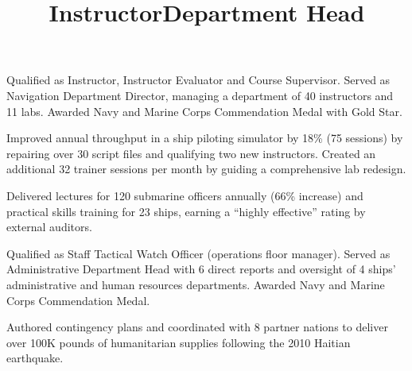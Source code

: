 \documentclass[line]{res}
\begin{document}
\begin{resume}
\title{\bf Instructor}
\begin{position}
\vspace*{-.2cm}
\begin{list2}
	\item Qualified as Instructor, Instructor Evaluator and Course Supervisor. Served as Navigation Department Director, managing a department of 40 instructors and 11 labs. Awarded Navy and Marine Corps Commendation Medal with Gold Star.
	\item Improved annual throughput in a ship piloting simulator by 18\% (75 sessions) by repairing over 30 script files and qualifying two new instructors. Created an additional 32 trainer sessions per month by guiding a comprehensive lab redesign. 
	\item Delivered lectures for 120 submarine officers annually (66\% increase) and practical skills training for 23 ships, earning a ``highly effective'' rating by external auditors. 
\end{list2}
\end{position}

\title{\bf Department Head}
\begin{position}
\vspace*{-.2cm}
\begin{list2}
	\item Qualified as Staff Tactical Watch Officer (operations floor manager). Served as Administrative Department Head with 6 direct reports and oversight of 4 ships' administrative and human resources departments. Awarded Navy and Marine Corps Commendation Medal.
	\item Authored contingency plans and coordinated with 8 partner nations to deliver over 100K pounds of humanitarian supplies following the 2010 Haitian earthquake. 
\end{list2}
\end{position}


\end{resume}
\end{document}

